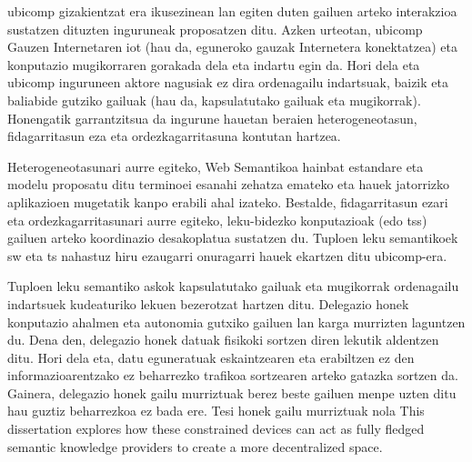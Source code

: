 \begin{resumen}
\end{resumen}



\begin{laburpena}        %
\acf{ubicomp} gizakientzat era ikusezinean lan egiten duten gailuen arteko interakzioa sustatzen dituzten inguruneak proposatzen ditu. %
Azken urteotan, \ac{ubicomp} Gauzen Internetaren \acs{iot} (hau da, eguneroko gauzak Internetera konektatzea) eta konputazio mugikorraren gorakada dela eta indartu egin da.
Hori dela eta \ac{ubicomp} inguruneen aktore nagusiak ez dira ordenagailu indartsuak, baizik eta baliabide gutziko gailuak (hau da, kapsulatutako gailuak eta mugikorrak). %
Honengatik garrantzitsua da ingurune hauetan beraien heterogeneotasun, fidagarritasun eza eta ordezkagarritasuna kontutan hartzea.


Heterogeneotasunari aurre egiteko, Web Semantikoa hainbat estandare eta modelu proposatu ditu terminoei esanahi zehatza emateko eta hauek jatorrizko aplikazioen mugetatik kanpo erabili ahal izateko.
Bestalde, fidagarritasun ezari eta ordezkagarritasunari aurre egiteko, leku-bidezko konputazioak (edo \aclp{ts}) gailuen arteko koordinazio desakoplatua sustatzen du. %
Tuploen leku semantikoek \acl{sw} eta \acl{ts} nahastuz hiru ezaugarri onuragarri hauek ekartzen ditu \ac{ubicomp}-era.


Tuploen leku semantiko askok kapsulatutako gailuak eta mugikorrak ordenagailu indartsuek kudeaturiko lekuen bezerotzat hartzen ditu.
Delegazio honek konputazio ahalmen eta autonomia gutxiko gailuen lan karga murrizten laguntzen du. %
Dena den, delegazio honek datuak fisikoki sortzen diren lekutik aldentzen ditu.
Hori dela eta, datu eguneratuak eskaintzearen eta erabiltzen ez den informazioarentzako ez beharrezko trafikoa sortzearen arteko gatazka sortzen da.
Gainera, delegazio honek gailu murriztuak berez beste gailuen menpe uzten ditu hau guztiz beharrezkoa ez bada ere. %
Tesi honek gailu murriztuak nola %
This dissertation explores how these constrained devices can act as fully fledged semantic knowledge providers to create a more decentralized space.



\end{laburpena}
